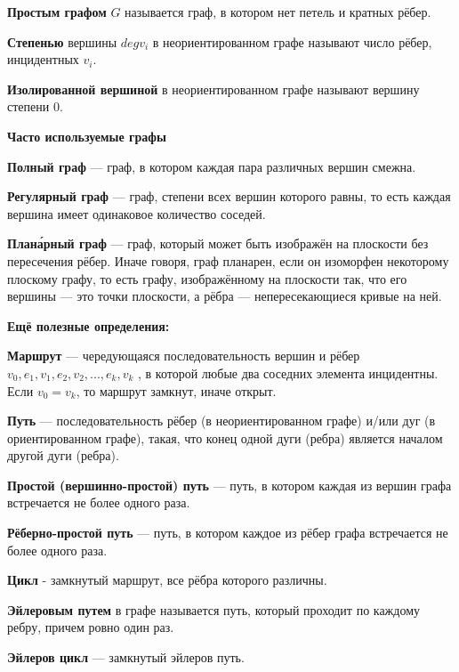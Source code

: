 \documentclass[12pt]{matmex-diploma}
\begin{document}
            \textbf{Простым графом} $G$ называется граф, в котором нет петель и кратных рёбер.
            
            \textbf{Степенью} вершины $deg v_i$ в неориентированном графе называют число рёбер, инцидентных $v_i$.
            
            \textbf{Изолированной вершиной} в неориентированном графе называют вершину степени 0.
            
            \textbf{Часто используемые графы}
            
            \textbf{Полный граф} — граф, в котором каждая пара различных вершин смежна.
            
            \textbf{Регулярный граф} — граф, степени всех вершин которого равны, то есть каждая вершина имеет одинаковое количество соседей.
            
            \textbf{Плана́рный граф} — граф, который может быть изображён на плоскости без пересечения рёбер. Иначе говоря, граф планарен, если он изоморфен некоторому плоскому графу, то есть графу, изображённому на плоскости так, что его вершины — это точки плоскости, а рёбра — непересекающиеся кривые на ней.
          
            \textbf{Ещё полезные определения:}
            
            \textbf{Маршрут }— чередующаяся последовательность вершин и рёбер $v_0, e_1, v_1, e_2, v_2,...,e_k,v_k$ , в которой любые два соседних элемента инцидентны. Если $v_0 = v_k$, то маршрут замкнут, иначе открыт.
            
            \textbf{Путь} — последовательность рёбер (в неориентированном графе) и/или дуг (в ориентированном графе), такая, что конец одной дуги (ребра) является началом другой дуги (ребра).
            
            \textbf{Простой (вершинно-простой) путь} — путь, в котором каждая из вершин графа встречается не более одного раза.
            
            \textbf{Рёберно-простой путь} — путь, в котором каждое из рёбер графа встречается не более одного раза.
            
            \textbf{Цикл} - замкнутый маршрут, все рёбра которого различны.
            
            \textbf{Эйлеровым путем} в графе называется путь, который проходит по каждому ребру, причем ровно один раз.
            
            \textbf{Эйлеров цикл} — замкнутый эйлеров путь.
            
\end{document}
